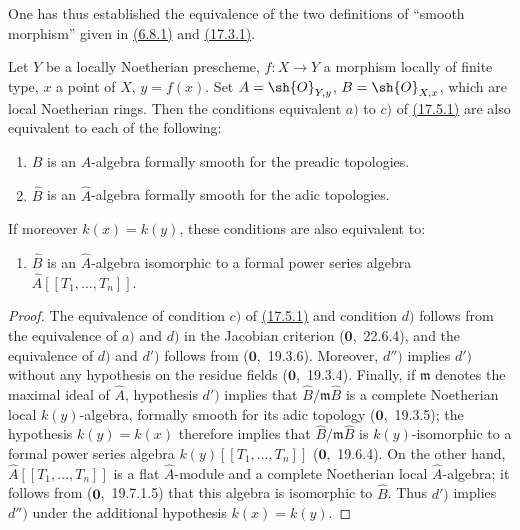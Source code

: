 One has thus established the equivalence of the two definitions of ``smooth morphism'' given in {\hyperlink{ega4.c04.def.6-8-1}{(6.8.1)}} and {\hyperlink{ega4.c04.def.17-3-1}{(17.3.1)}}.

\begin{proposition}[17.5.3]
\label{IV.17.5.3}
Let $Y$ be a locally Noetherian prescheme, $f:X\to Y$ a morphism locally of finite type, $x$ a point of $X$, $y=f(x)$.
Set $A=\sh{O}_{Y,y}$, $B=\sh{O}_{X,x}$, which are local Noetherian rings.
Then the conditions equivalent $a)$ to $c)$ of {\hyperlink{ega4.c04.thm.17-5-1}{(17.5.1)}} are also equivalent to each of the following:


\begin{enumerate}
  \item[d)] $B$ is an $A$-algebra formally smooth for the preadic topologies.
  \item[d')] $\hat{B}$ is an $\hat{A}$-algebra formally smooth for the adic topologies.
\end{enumerate}
If moreover $k(x)=k(y)$, these conditions are also equivalent to:
\begin{enumerate}
  \item[d'')] $\hat{B}$ is an $\hat{A}$-algebra isomorphic to a formal power series algebra $\hat{A}[[T_1,\ldots,T_n]]$.
\end{enumerate}
\end{proposition}

\begin{proof}
The equivalence of condition $c)$ of {\hyperlink{ega4.c04.thm.17-5-1}{(17.5.1)}} and condition $d)$ follows from the equivalence of $a)$ and $d)$ in the Jacobian criterion ($\mathbf{0}$,~22.6.4), and the equivalence of $d)$ and $d')$ follows from ($\mathbf{0}$,~19.3.6).
Moreover, $d'')$ implies $d')$ without any hypothesis on the residue fields ($\mathbf{0}$,~19.3.4).
Finally, if $\mathfrak{m}$ denotes the maximal ideal of $\hat{A}$, hypothesis $d')$ implies that $\hat{B}/\mathfrak{m}\hat{B}$ is a complete Noetherian local $k(y)$-algebra, formally smooth for its adic topology ($\mathbf{0}$,~19.3.5); the hypothesis $k(y)=k(x)$ therefore implies that $\hat{B}/\mathfrak{m}\hat{B}$ is $k(y)$-isomorphic to a formal power series algebra $k(y)[[T_1,\ldots,T_n]]$ ($\mathbf{0}$,~19.6.4).
On the other hand, $\hat{A}[[T_1,\ldots,T_n]]$ is a flat $\hat{A}$-module and a complete Noetherian local $\hat{A}$-algebra; it follows from ($\mathbf{0}$,~19.7.1.5) that this algebra is isomorphic to $\hat{B}$.
Thus $d')$ implies $d'')$ under the additional hypothesis $k(x)=k(y)$.
\end{proof}


